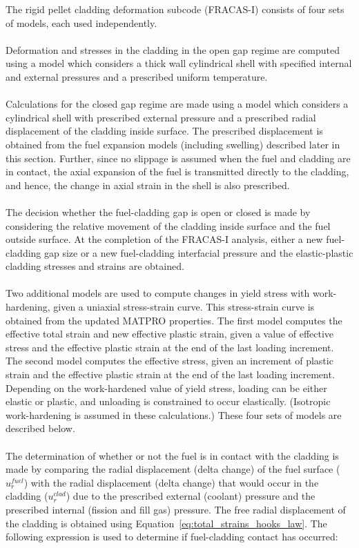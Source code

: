 The rigid pellet cladding deformation subcode (FRACAS-I) consists of four sets of models, each used
independently.
\\
\\
Deformation and stresses in the cladding in the open gap regime are computed using a model which
considers a thick wall cylindrical shell with specified internal and external pressures and a
prescribed uniform temperature.
\\
\\
Calculations for the closed gap regime are made using a model which considers a cylindrical shell
with prescribed external pressure and a prescribed radial displacement of the cladding inside
surface. The prescribed displacement is obtained from the fuel expansion models (including swelling)
described later in this section. Further, since no slippage is assumed when the fuel and cladding
are in contact, the axial expansion of the fuel is transmitted directly to the cladding, and hence,
the change in axial strain in the shell is also prescribed.
\\
\\
The decision whether the fuel-cladding gap is open or closed is made by considering the relative
movement of the cladding inside surface and the fuel outside surface. At the completion of the
FRACAS-I analysis, either a new fuel-cladding gap size or a new fuel-cladding interfacial pressure
and the elastic-plastic cladding stresses and strains are obtained.
\\
\\
Two additional models are used to compute changes in yield stress with work-hardening, given a
uniaxial stress-strain curve. This stress-strain curve is obtained from the updated MATPRO
properties. The first model computes the effective total strain and new effective plastic strain,
given a value of effective stress and the effective plastic strain at the end of the last loading
increment. The second model computes the effective stress, given an increment of plastic strain and
the effective plastic strain at the end of the last loading increment. Depending on the
work-hardened value of yield stress, loading can be either elastic or plastic, and unloading is
constrained to occur elastically.  (Isotropic work-hardening is assumed in these calculations.)
These four sets of models are described below.
\\
\\
The determination of whether or not the fuel is in contact with the cladding is made by comparing
the radial displacement (delta change) of the fuel surface ($u_{r}^{fuel}$) with the radial
displacement (delta change) that would occur in the cladding ($u_{r}^{clad}$) due to the prescribed
external (coolant) pressure and the prescribed internal (fission and fill gas) pressure. The free
radial displacement of the cladding is obtained using Equation~\ref{eq:total_strains_hooks_law}.
The following expression is used to determine if fuel-cladding contact has occurred:

